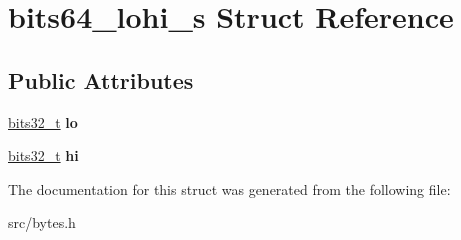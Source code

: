 \hypertarget{structbits64__lohi__s}{}\section{bits64\+\_\+lohi\+\_\+s Struct Reference}
\label{structbits64__lohi__s}
\subsection*{Public Attributes}
\begin{DoxyCompactItemize}
\item 
\hypertarget{structbits64__lohi__s_a2a6a22a377dc61c098602dd961b8c1f2}{}\label{structbits64__lohi__s_a2a6a22a377dc61c098602dd961b8c1f2} 
\hyperlink{unionbits32__t}{bits32\+\_\+t} {\bfseries lo}
\item 
\hypertarget{structbits64__lohi__s_adbca1ef7d341b9db5e1ab0f48ce04601}{}\label{structbits64__lohi__s_adbca1ef7d341b9db5e1ab0f48ce04601} 
\hyperlink{unionbits32__t}{bits32\+\_\+t} {\bfseries hi}
\end{DoxyCompactItemize}


The documentation for this struct was generated from the following file\+:\begin{DoxyCompactItemize}
\item 
src/bytes.\+h\end{DoxyCompactItemize}
